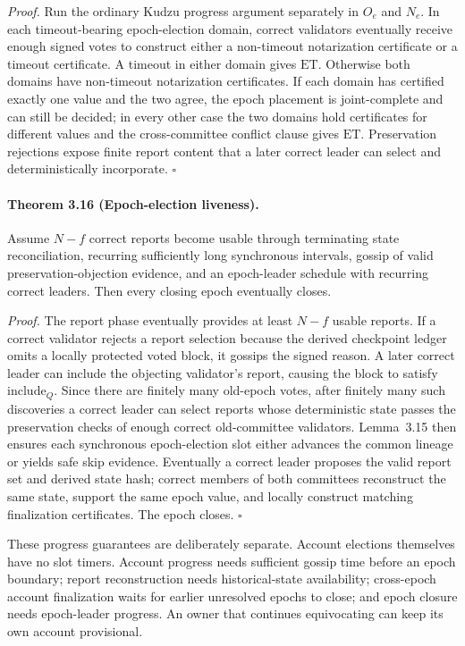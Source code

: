 \documentclass[10pt,twocolumn]{article}
\newcommand{\ET}{\mathrm{ET}}
\newcommand{\Include}{\mathrm{include}}
\begin{document}
\emph{Proof.} Run the ordinary Kudzu progress argument separately in $O_e$ and $N_e$. In each timeout-bearing epoch-election domain, correct validators eventually receive enough signed votes to construct either a non-timeout notarization certificate or a timeout certificate. A timeout in either domain gives $\ET$. Otherwise both domains have non-timeout notarization certificates. If each domain has certified exactly one value and the two agree, the epoch placement is joint-complete and can still be decided; in every other case the two domains hold certificates for different values and the cross-committee conflict clause gives $\ET$. Preservation rejections expose finite report content that a later correct leader can select and deterministically incorporate. $\square$

\paragraph{Theorem 3.16 (Epoch-election liveness).} Assume $N-f$ correct reports become usable through terminating state reconciliation, recurring sufficiently long synchronous intervals, gossip of valid preservation-objection evidence, and an epoch-leader schedule with recurring correct leaders. Then every closing epoch eventually closes.

\emph{Proof.} The report phase eventually provides at least $N-f$ usable reports. If a correct validator rejects a report selection because the derived checkpoint ledger omits a locally protected voted block, it gossips the signed reason. A later correct leader can include the objecting validator's report, causing the block to satisfy $\Include_Q$. Since there are finitely many old-epoch votes, after finitely many such discoveries a correct leader can select reports whose deterministic state passes the preservation checks of enough correct old-committee validators. Lemma~3.15 then ensures each synchronous epoch-election slot either advances the common lineage or yields safe skip evidence. Eventually a correct leader proposes the valid report set and derived state hash; correct members of both committees reconstruct the same state, support the same epoch value, and locally construct matching finalization certificates. The epoch closes. $\square$

These progress guarantees are deliberately separate. Account elections themselves have no slot timers. Account progress needs sufficient gossip time before an epoch boundary; report reconstruction needs historical-state availability; cross-epoch account finalization waits for earlier unresolved epochs to close; and epoch closure needs epoch-leader progress. An owner that continues equivocating can keep its own account provisional.
\end{document}
